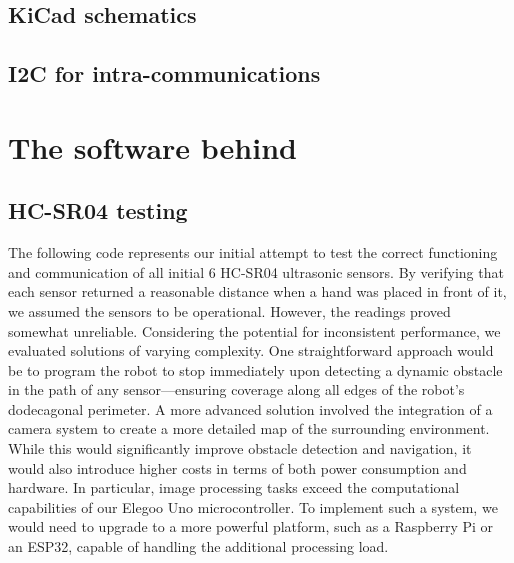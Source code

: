 \documentclass{article}
\begin{document}
\subsection{KiCad schematics}
\begin{figure}[H]
    \centering
\end{figure}


\subsection{I2C for intra-communications} %

\newpage
\section{The software behind} %
\newpage
\subsection{HC-SR04 testing} %
The following code represents our initial attempt to test the correct functioning and communication of all initial 6 HC-SR04 ultrasonic sensors. By verifying that each sensor returned a reasonable distance when a hand was placed in front of it, we assumed the sensors to be operational. However, the readings proved somewhat unreliable.
Considering the potential for inconsistent performance, we evaluated solutions of varying complexity. One straightforward approach would be to program the robot to stop immediately upon detecting a dynamic obstacle in the path of any sensor—ensuring coverage along all edges of the robot's dodecagonal perimeter.
A more advanced solution involved the integration of a camera system to create a more detailed map of the surrounding environment. While this would significantly improve obstacle detection and navigation, it would also introduce higher costs in terms of both power consumption and hardware. In particular, image processing tasks exceed the computational capabilities of our Elegoo Uno microcontroller. To implement such a system, we would need to upgrade to a more powerful platform, such as a Raspberry Pi or an ESP32, capable of handling the additional processing load.\\
\end{document}
